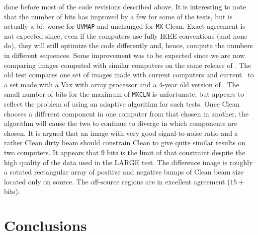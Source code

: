 done before most of the code revisions described above.  It is
interesting to note that the number of bits has improved by a few for
some of the tests, but is actually a bit worse for {\tt UVMAP} and
unchanged for {\tt MX} Clean.  Exact agreement is not expected since,
even if the computers use fully IEEE conventions (and none do), they
will still optimize the code differently and, hence, compute the
numbers in different sequences.  Some improvement was to be expected
since we are now comparing images computed with similar computers on
the same release of \AIPS.  The old test compares one set of images
made with current computers and current \AIPS\ to a set made with a
Vax with array processor and a 4-year old version of \AIPS.  The small
number of bits for the maximum of {\tt MXCLN} is unfortunate, but
appears to reflect the problem of using an adaptive algorithm for such
tests.  Once Clean chooses a different component in one computer from
that chosen in another, the algorithm will cause the two to continue
to diverge in which components are chosen.  It is argued that an image
with very good signal-to-noise ratio and a rather Clean dirty beam
should constrain Clean to give quite similar results on two computers.
It appears that 9 bits is the limit of that constraint despite the
high quality of the data used in the LARGE test.  The difference image
is roughly a rotated rectangular array of positive and negative bumps
of Clean beam size located only on source.  The off-source regions are
in excellent agreement ($15+$ bits).

\section{Conclusions}

